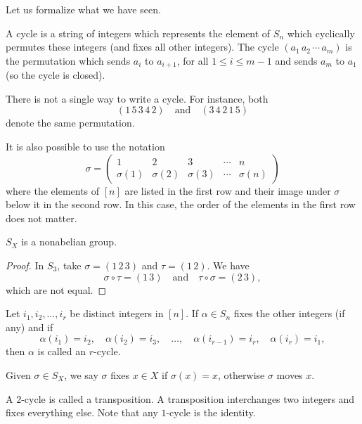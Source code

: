 \documentclass[11pt,a4paper]{article}
\begin{document}
Let us formalize what we have seen.


A cycle is a string of integers which represents the element of $S_n$ which cyclically permutes these integers (and fixes all other integers). The cycle  $(a_1\,  a_2 \, \cdots\,  a_m)$  is the permutation which sends $a_i$ to $a_{i+1}$, for all $1 \leq i \leq m-1$ and sends $a_m$ to $a_1$ (so the cycle is closed). 

There is not a single way to write a cycle.
For instance, both 
\[(1\, 5\, 3\, 4\, 2)\quad\text{and}\quad (3\, 4\, 2\, 1\, 5)\]
denote the same permutation.

\begin{rem}
    It is also possible to use the   notation 
    \[\sigma ={\begin{pmatrix}{1}&{2}&{3}&\cdots &{n}\\\sigma ({1})&\sigma ( {2})&\sigma ({3})&\cdots &\sigma ({n})\end{pmatrix}}\]
    where the elements of \([n]\) are listed in the first row and their image  under \(\sigma\) below it in the second row.
    In this case, the order of the elements in the first row does not matter.
\end{rem}



\begin{lem}
    \(S_X\) is a nonabelian group.
\end{lem}

\begin{proof}
    In \(S_3\), take \(\sigma = (1\, 2\, 3 )\) and \(\tau = (1\, 2)\).
    We have 
    \[\sigma \circ \tau = (1\, 3)\quad\text{and}\quad \tau\circ \sigma = (2\, 3),\]
    which are not equal.
\end{proof}


\begin{defi}
    Let $i_1, i_2, \dots, i_r$ be distinct integers in $[n]$. If $\alpha \in S_n$ fixes the other integers (if any) and if
\[
\alpha(i_1) = i_2, \quad \alpha(i_2) = i_3, \quad \dots, \quad \alpha(i_{r-1}) = i_r, \quad \alpha(i_r) = i_1,
\]
then $\alpha$ is called an $r$-cycle.
\end{defi}

Given  \(\sigma\in S_X\), we say \(\sigma\) fixes \(x\in X\) if \(\sigma(x) = x\), otherwise \(\sigma\) moves \(x\).

A \(2\)-cycle is called a transposition.
A transposition interchanges two integers and fixes everything else.
Note that any \(1\)-cycle is the identity.
\end{document}

